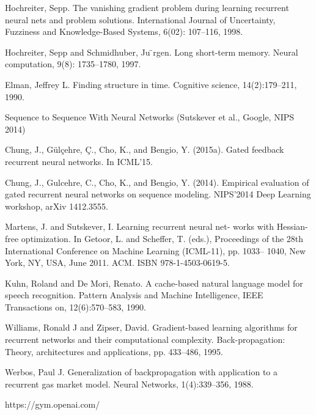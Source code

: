 \documentclass[a4paper,10pt]{article}
\begin{document}
\begin{thebibliography}{9}

 Hochreiter, Sepp. The vanishing gradient problem during learning recurrent neural nets and problem solutions. International Journal of Uncertainty, Fuzziness and Knowledge-Based Systems, 6(02): 107–116, 1998.

Hochreiter, Sepp and Schmidhuber, Ju ̈rgen. Long short-term memory. Neural computation, 9(8): 1735–1780, 1997.

 Elman, Jeffrey L. Finding structure in time. Cognitive science, 14(2):179–211, 1990.

 Sequence to Sequence With Neural Networks (Sutskever et al., Google, NIPS 2014)

 Chung, J., Gülçehre, Ç., Cho, K., and Bengio, Y. (2015a). Gated feedback recurrent neural networks. In ICML’15.

 Chung, J., Gulcehre, C., Cho, K., and Bengio, Y. (2014). Empirical evaluation of gated
recurrent neural networks on sequence modeling. NIPS’2014 Deep Learning workshop,
arXiv 1412.3555.

 Martens, J. and Sutskever, I. Learning recurrent neural net- works with Hessian-free optimization. In Getoor, L. and Scheffer, T. (eds.), Proceedings of the 28th International Conference on Machine Learning (ICML-11), pp. 1033– 1040, New York, NY, USA, June 2011. ACM. ISBN 978-1-4503-0619-5.

 Kuhn, Roland and De Mori, Renato. A cache-based natural language model for speech recognition. Pattern Analysis and Machine Intelligence, IEEE Transactions on, 12(6):570–583, 1990.

 Williams, Ronald J and Zipser, David. Gradient-based learning algorithms for recurrent networks and their computational complexity. Back-propagation: Theory, architectures and applications, pp. 433–486, 1995.

 Werbos, Paul J. Generalization of backpropagation with application to a recurrent gas market model. Neural Networks, 1(4):339–356, 1988.

 https://gym.openai.com/
\end{thebibliography}
\end{document}
